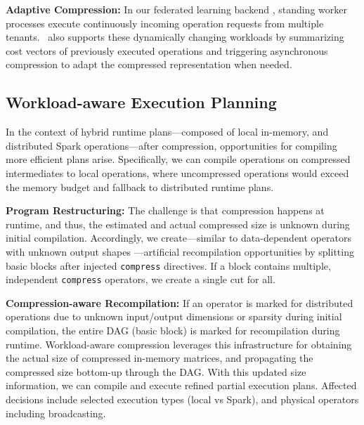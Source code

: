 \textbf{Adaptive Compression:} In our federated learning backend \cite{Baunsgaard0CDGG21,Baunsgaard0IKLO22}, 
standing worker processes execute continuously incoming
operation requests from multiple tenants. \name\ also supports these
dynamically changing workloads by summarizing cost vectors of previously
executed operations and triggering asynchronous compression to adapt the
compressed representation when needed.


\subsection{Workload-aware Execution Planning}
\label{sec:wlc2}

In the context of hybrid runtime plans---composed of local in-memory, and distributed Spark operations---after compression, opportunities for compiling more efficient plans arise.
Specifically, we can compile operations on compressed intermediates to local operations, where uncompressed operations would exceed the memory budget and fallback to distributed runtime plans.

\textbf{Program Restructuring:} The challenge is that compression happens at runtime, and thus, the estimated and actual compressed size is unknown during initial compilation. Accordingly, we create---similar to data-dependent operators with unknown output shapes \cite{BoehmBERRSTT14}---artificial recompilation opportunities by splitting basic blocks after injected \texttt{compress} directives. If a block contains multiple, independent \texttt{compress} operators, we create a single cut for all.

\textbf{Compression-aware Recompilation:}
If an operator is marked for distributed operations due to unknown input/output dimensions or sparsity during initial compilation,
the entire DAG (basic block) is marked for recompilation during runtime.
Workload-aware compression leverages this infrastructure for obtaining the actual size of compressed in-memory matrices,
and propagating the compressed size bottom-up through the DAG.
With this updated size information, we can compile and execute refined partial execution plans.
Affected decisions include selected execution types (local vs Spark), and physical operators including broadcasting.
